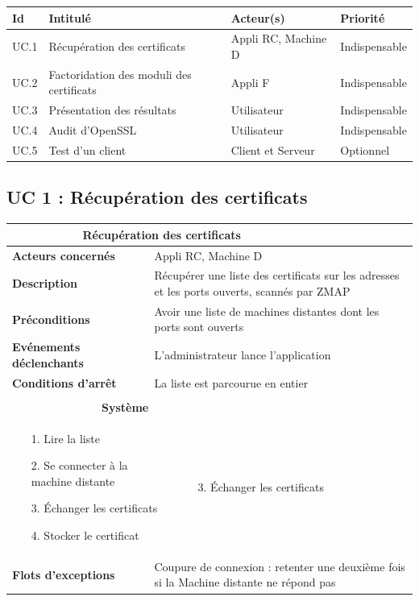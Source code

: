 \documentclass[a4paper,11pt,french]{article}
\newcommand{\fiche}[9] {
	\noindent
\begin{tabular}{|p{4cm}| p{2cm} | p{4cm} | p{.5cm} | p{7cm}|} 
\hline
\rowcolor{blue}
\multicolumn{2}{|l|}{\color{white}\bfseries{Nom}} & \multicolumn{3}{l|}{\color{white}\bfseries{#1}}\\
\hline
\multicolumn{2}{|l|}{\bfseries{Acteurs concernés}} & \multicolumn{3}{m{10.5cm}|}{#2}\\
\hline
\multicolumn{2}{|l|}{\bfseries{Description}} & \multicolumn{3}{m{10.5cm}|}{#3}\\
\hline
\multicolumn{2}{|l|}{\bfseries{Préconditions}} & \multicolumn{3}{m{10.5cm}|}{#4}\\
\hline
\multicolumn{2}{|l|}{\bfseries{Evénements déclenchants}} & \multicolumn{3}{m{10.5cm}|}{#5}\\
\hline
\multicolumn{2}{|l|}{\bfseries{Conditions d'arrêt}} & \multicolumn{3}{m{10.5cm}|}{#6}\\
\hline
\rowcolor{gray}
\multicolumn{5}{|c|}{\bfseries{Description du flot d'événements principal}}\\
\hline
\rowcolor{gray}
\multicolumn{3}{|c|}{\bfseries{Acteur(s)}} & \multicolumn{2}{c|}{\bfseries{Système}}\\
\hline
\multicolumn{3}{|p{7.5cm}|}{#7} & \multicolumn{2}{p{7.5cm}|}{#8}\\
\hline
\multicolumn{2}{|l}{\bfseries{Flots d'exceptions}} & \multicolumn{3}{|p{11.5cm}|}{#9}\\
\hline
\end{tabular}
\\
}
\begin{document}
\begin{center}
\begin{tabular}{|l|p{6cm}|p{6cm}|l|}
\hline
\bfseries{Id} & \bfseries{Intitulé} & \bfseries{Acteur(s)} & \bfseries{Priorité}\\
\hline
UC.1 & Récupération des certificats & Appli RC, Machine D & Indispensable\\
\hline
UC.2 & Factoridation des moduli des certificats & Appli F & Indispensable\\
\hline
UC.3 & Présentation des résultats & Utilisateur & Indispensable\\
\hline
UC.4 & Audit d'OpenSSL & Utilisateur & Indispensable\\
\hline
UC.5 & Test d'un client & Client et Serveur & Optionnel\\
\hline
\end{tabular}
\end{center}


\subsection{UC 1 : Récupération des certificats}

\fiche
	{Récupération des certificats} %
	{Appli RC, Machine D} %
	{Récupérer une liste des certificats sur les adresses et les ports ouverts, scannés par ZMAP} %
	{Avoir une liste de machines distantes dont les ports sont ouverts} %
	{L'administrateur lance l'application} %
	{La liste est parcourue en entier} %
	{\begin{itemize}  %
		\item [1.] Lire la liste
		\item [2.] Se connecter à la machine distante
		\item [3.] Échanger les certificats
		\item [4.] Stocker le certificat
	 \end{itemize}
	} 
	{\begin{itemize}  %
		\item []
		\item []
		\item [3.] Échanger les certificats
	\end{itemize}
	 }
	{Coupure de connexion : retenter une deuxième fois si la Machine distante ne répond pas} %
\end{document}
